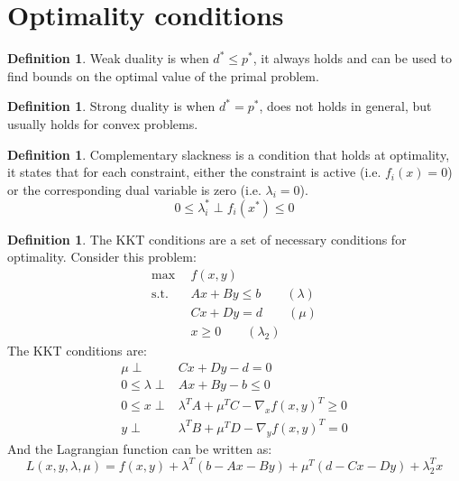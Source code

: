 \documentclass[12pt, openany]{report}
\theoremstyle{definition}
\newtheorem{definition}[thm]{Definition}
\begin{document}
\section{Optimality conditions}
\begin{definition}
    Weak duality is when $d^* \leq p^*$, it always holds and can be used to find bounds on the optimal value of the primal problem.
\end{definition}
\begin{definition}
    Strong duality is when $d^* = p^*$, does not holds in general, but usually holds for convex problems.
\end{definition}
\begin{definition}
    Complementary slackness is a condition that holds at optimality, it states that for each constraint, either the constraint is active (i.e. $f_i(x) = 0$) or the corresponding dual variable is zero (i.e. $\lambda_i = 0$).
    \begin{equation}
        0 \leq \lambda_i^* \perp f_i(x^*) \leq 0
    \end{equation}
\end{definition}
\begin{definition}
    The KKT conditions are a set of necessary conditions for optimality. Consider this problem:
    \begin{equation}
        \begin{aligned}
            \max \: \: &f(x,y) \\
            \text{s.t.} \: \: &Ax + By \leq b \qquad (\lambda) \\
            & Cx + Dy = d \qquad (\mu) \\
            & x \geq 0 \qquad (\lambda_2)
        \end{aligned}
    \end{equation}
    The KKT conditions are:
    \begin{equation}
        \begin{aligned}
            \mu \perp & Cx + Dy - d = 0 \\
            0 \leq \lambda \perp & Ax + By -b \leq 0 \\
            0 \leq x \perp & \lambda^T A + \mu^T C - \nabla_x f(x,y)^T \geq 0 \\
            y \perp & \lambda^T B + \mu^T D - \nabla_y f(x,y)^T = 0
        \end{aligned}
    \end{equation}
    And the Lagrangian function can be written as:
    \begin{equation}
        L(x,y,\lambda, \mu) = f(x,y) + \lambda^T (b - Ax - By) + \mu^T (d - Cx - Dy) + \lambda_2^Tx
    \end{equation}
\end{definition}
\end{document}
